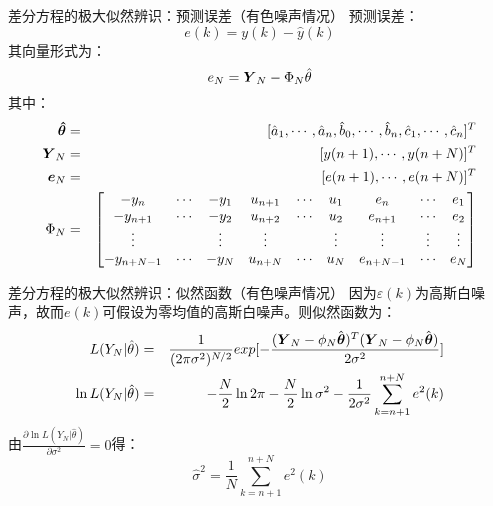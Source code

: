 \bgroup
{}
\begin{frame}{差分方程的极大似然辨识：预测误差（有色噪声情况）}
预测误差：
$$
e(k)=y(k)-\hat y(k)
$$
其向量形式为：
$$
e_N=\boldsymbol{Y}_N-\Phi_N\hat\theta
$$
其中：
\begin{eqnarray*}
\boldsymbol{\hat\theta} &=& [\hat a_1, \cdots, \hat a_n, \hat b_0 , \cdots, \hat b_n, \hat c_1, \cdots, \hat c_n]^T \\
\boldsymbol{Y}_N &=& [y(n+1), \cdots, y(n+N)]^T \\
\boldsymbol{e}_N &=& [e(n+1), \cdots, e(n+N)]^T \\
\Phi_N &=& 
\begin{bmatrix}
-y_n & \cdots & -y_1 & u_{n+1} & \cdots & u_1  & e_n & \cdots & e_1 \\
-y_{n+1} & \cdots & -y_2 & u_{n+2} & \cdots & u_2  & e_{n+1} & \cdots & e_2 \\
\vdots &        & \vdots &   \vdots &      &\vdots & \vdots & \vdots & \vdots \\
-y_{n+N-1} & \cdots & -y_N & u_{n+N} & \cdots & u_N  & e_{n+N-1} & \cdots & e_N
\end{bmatrix}
\end{eqnarray*}
\end{frame}
\egroup

\begin{frame}{差分方程的极大似然辨识：似然函数（有色噪声情况）}
因为$\varepsilon(k)$为高斯白噪声，故而$e(k)$可假设为零均值的高斯白噪声。则似然函数为：
\begin{eqnarray*}
L(Y_N|\hat{\theta}) &=& \frac{1}{(2\pi\sigma^2)^{N/2}}exp[-\frac{(\boldsymbol{Y}_N-\phi_N\hat{\boldsymbol{\theta}})^T(\boldsymbol{Y}_N-\phi_N\hat{\boldsymbol{\theta}})}{2\sigma^2}] \\
\ln L(Y_N|\hat{\theta}) &=& - \frac{N}{2}\ln{2\pi}-\frac{N}{2}\ln\sigma^2-\frac{1}{2\sigma^2}\sum^{n+N}_{k=n+1}e^2(k)
\end{eqnarray*}
由$\frac{\partial\ln L(Y_N|\hat{\theta})}{\partial\sigma^2}=0$得：
$$
\hat\sigma^2=\frac{1}{N}\sum^{n+N}_{k=n+1}e^2(k)
$$
\end{frame}

